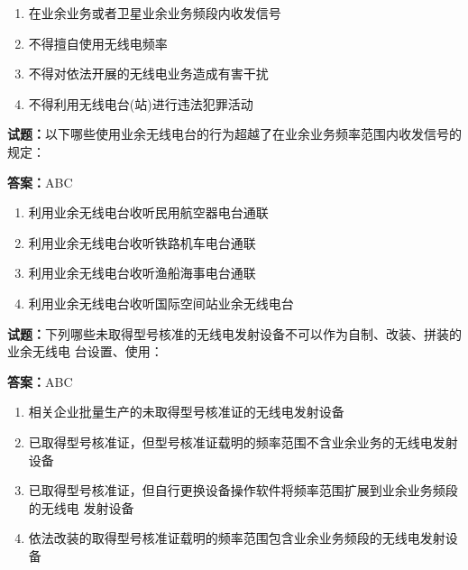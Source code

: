 \documentclass{ctexbook}
\begin{document}
\begin{enumerate}[leftmargin=3em]
  \item 在业余业务或者卫星业余业务频段内收发信号 

  \item 不得擅自使用无线电频率 

  \item 不得对依法开展的无线电业务造成有害干扰 

  \item 不得利用无线电台(站)进行违法犯罪活动 

\end{enumerate}





\vspace{1em}

\textbf{试题：}以下哪些使用业余无线电台的行为超越了在业余业务频率范围内收发信号的规定： 

\textbf{答案：}ABC 

\begin{enumerate}[leftmargin=3em]
  \item 利用业余无线电台收听民用航空器电台通联 

  \item 利用业余无线电台收听铁路机车电台通联 

  \item 利用业余无线电台收听渔船海事电台通联 

  \item 利用业余无线电台收听国际空间站业余无线电台 

\end{enumerate}





\vspace{1em}

\textbf{试题：}下列哪些未取得型号核准的无线电发射设备不可以作为自制、改装、拼装的业余无线电
台设置、使用： 

\textbf{答案：}ABC 

\begin{enumerate}[leftmargin=3em]
  \item 相关企业批量生产的未取得型号核准证的无线电发射设备 

  \item 已取得型号核准证，但型号核准证载明的频率范围不含业余业务的无线电发射设备 

  \item 已取得型号核准证，但自行更换设备操作软件将频率范围扩展到业余业务频段的无线电
发射设备 

  \item 依法改装的取得型号核准证载明的频率范围包含业余业务频段的无线电发射设备 


\end{enumerate}
\end{document}
